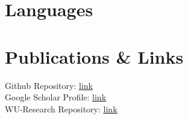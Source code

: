 \documentclass[a4paper]{twentysecondcv} %
\begin{document}

\section{Languages}

\begin{twenty} %
\end{twenty}





\section{Publications \& Links}

Github Repository: \href{https://github.com/CourtVision/}{\underline{link}} \\
Google Scholar Profile: \href{https://scholar.google.com/citations?user=tQGuPUEAAAAJ&hl=en}{\underline{link}} \\
WU-Research Repository: \href{https://bach.wu.ac.at/d/research/ma/10499/#publications.}{\underline{link}}













\end{document}
